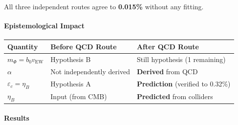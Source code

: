 \documentclass[
  11pt,
]{article}
\begin{document}
All three independent routes agree to \textbf{0.015\%} without any
fitting.

\bigskip

\hypertarget{epistemological-impact}{%
\paragraph{Epistemological Impact}\label{epistemological-impact}}

\begin{longtable}[]{@{}lll@{}}
\toprule
Quantity & Before QCD Route & After QCD Route\tabularnewline
\midrule
\endhead
\(m_\Phi = b_0 v_\text{EW}\) & Hypothesis B & Still hypothesis (1
remaining)\tabularnewline
\(\alpha\) & Not independently derived & \textbf{Derived} from
QCD\tabularnewline
\(\varepsilon_c = \eta_B\) & Hypothesis A & \textbf{Prediction}
(verified to 0.32\%)\tabularnewline
\(\eta_B\) & Input (from CMB) & \textbf{Predicted} from
colliders\tabularnewline
\bottomrule
\end{longtable}

\bigskip

\hypertarget{results-9}{%
\paragraph{Results}\label{results-9}}
\end{document}
